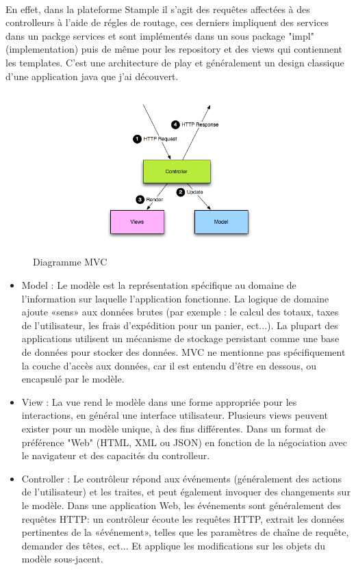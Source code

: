 \paragraph{}
En effet, dans la plateforme Stample il s'agit des requêtes affectées à des controlleurs à l'aide de régles de routage, ces derniers impliquent des services dans un packge services et sont implémentés dans un sous package "impl" (implementation) puis de même pour les repository et des views qui contiennent les templates.
C'est une architecture de play et généralement un design classique d'une application java que j'ai découvert.
\begin{figure}[H]
        \centering
                \centering
                \includegraphics[width=\textwidth]{diagrams_mvc.png}
                \caption{Diagramme MVC}
                \label{fig:Diagramme MVC}
       
\end{figure}
\begin{itemize}
\item Model : Le modèle est la représentation spécifique au domaine de l'information sur laquelle l'application fonctionne. La logique de domaine ajoute «sens» aux données brutes (par exemple : le calcul des totaux, taxes de l'utilisateur, les frais d'expédition pour un panier, ect...). La plupart des applications utilisent un mécanisme de stockage persistant comme une base de données pour stocker des données. MVC ne mentionne pas spécifiquement la couche d'accès aux données, car il est entendu d'être en dessous, ou encapsulé par le modèle.
\item View : La vue rend le modèle dans une forme appropriée pour les interactions, en général une interface utilisateur. Plusieurs views peuvent exister pour un modèle unique, à des fins différentes. Dans un format de préférence "Web" (HTML, XML ou JSON) en fonction de la négociation avec le navigateur et des capacités du controlleur.
\item Controller : Le contrôleur répond aux événements (généralement des actions de l'utilisateur) et les traites, et peut également invoquer des changements sur le modèle. Dans une application Web, les événements sont généralement des requêtes HTTP: un contrôleur écoute les requêtes HTTP, extrait les données pertinentes de la «événement», telles que les paramètres de chaîne de requête, demander des têtes, ect... Et applique les modifications sur les objets du modèle sous-jacent.

\end{itemize}

